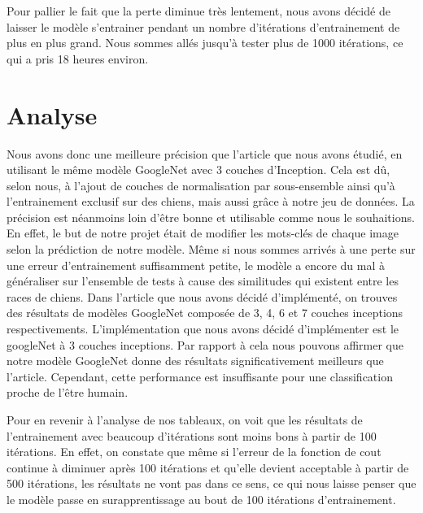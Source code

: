 \documentclass{article}
\begin{document}
Pour pallier le fait que la perte diminue très lentement, nous avons décidé de
laisser le modèle s’entrainer pendant un nombre d’itérations d’entrainement de
plus en plus grand. Nous sommes allés jusqu’à tester plus de 1000 itérations, ce
qui a pris 18 heures environ.

\section{Analyse}
Nous avons donc une meilleure précision que l’article que nous avons étudié,
en utilisant le même modèle GoogleNet avec 3 couches d'Inception. Cela est dû,
selon nous, à l’ajout de couches de normalisation par sous-ensemble ainsi qu’à
l’entrainement exclusif sur des chiens, mais aussi grâce à notre jeu de données.
La précision est néanmoins loin d’être bonne et utilisable comme nous le
souhaitions. En effet, le but de notre projet était de modifier les mots-clés de
chaque image selon la prédiction de notre modèle. Même si nous sommes arrivés à
une perte sur une erreur d’entrainement suffisamment petite, le modèle a encore
du mal à généraliser sur l’ensemble de tests à cause des similitudes qui
existent entre les races de chiens. Dans l'article que nous avons décidé
d'implémenté, on trouves des résultats de modèles GoogleNet composée de 3, 4, 6
et 7 couches inceptions respectivements. L'implémentation que nous avons décidé
d'implémenter est le googleNet à 3 couches inceptions. Par rapport à cela nous
pouvons affirmer que notre modèle GoogleNet donne des résultats
significativement meilleurs que l'article. Cependant, cette performance est
insuffisante pour une classification proche de l'être humain.

Pour en revenir à l’analyse de nos tableaux, on voit que les résultats de
l’entrainement avec beaucoup d’itérations sont moins bons à partir de 100
itérations. En effet, on constate que même si l’erreur de la fonction de cout
continue à diminuer après 100 itérations et qu’elle devient acceptable à partir
de 500 itérations, les résultats ne vont pas dans ce sens, ce qui nous laisse
penser que le modèle passe en surapprentissage au bout de 100 itérations
d’entrainement. 
\end{document}
